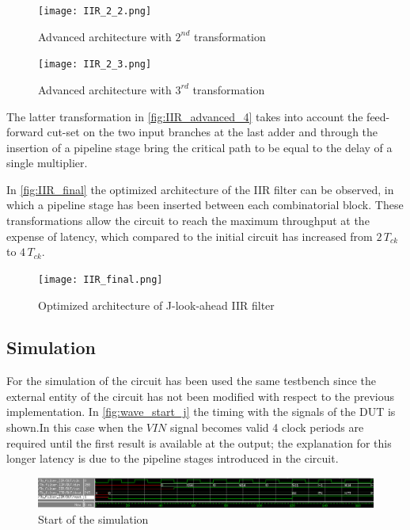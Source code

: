 \begin{figure}[ht]
	\begin{minipage}[b]{0.5\linewidth}
		\centering
		\texttt{[image: IIR\_2\_2.png]}
		\caption{Advanced architecture with $2^{nd}$ transformation}
		\label{fig:IIR_advanced_3}
	\end{minipage}
	\hspace{0.5cm}
	\begin{minipage}[b]{0.5\linewidth}
		\centering
		\texttt{[image: IIR\_2\_3.png]}
		\caption{Advanced architecture with $3^{rd}$ transformation}
		\label{fig:IIR_advanced_4}
	\end{minipage}
\end{figure}

The latter transformation in \autoref{fig:IIR_advanced_4} takes into account the feed-forward cut-set on the two input branches at the last adder and through the insertion of a pipeline stage bring the critical path to be equal to the delay of a single multiplier.

In \autoref{fig:IIR_final} the optimized architecture of the IIR filter can be observed, in which a pipeline stage has been inserted between each combinatorial block. These transformations allow the circuit to reach the maximum throughput at the expense of latency, which compared to the initial circuit has increased from $2\,T_{ck}$ to $4\,T_{ck}$.

\begin{figure}[htb]
	\center
	\texttt{[image: IIR\_final.png]}
	\caption{Optimized architecture of J-look-ahead IIR filter}
	\label{fig:IIR_final}
	\end{figure}

\pagebreak

\subsection{Simulation}
For the simulation of the circuit has been used the same testbench since the external entity of the circuit has not been modified with respect to the previous implementation.
In \autoref{fig:wave_start_j} the timing with the signals of the DUT is shown.In this case when the $VIN$ signal becomes valid 4 clock periods are required until the first result is available at the output; the explanation for this longer latency is due to the pipeline stages introduced in the circuit.

\begin{figure}[h]
	\center
	\includegraphics[width=1\textwidth]{images/wave_start_j_look_ahead.png}
	\caption{Start of the simulation}
	\label{fig:wave_start_j}
\end{figure}

